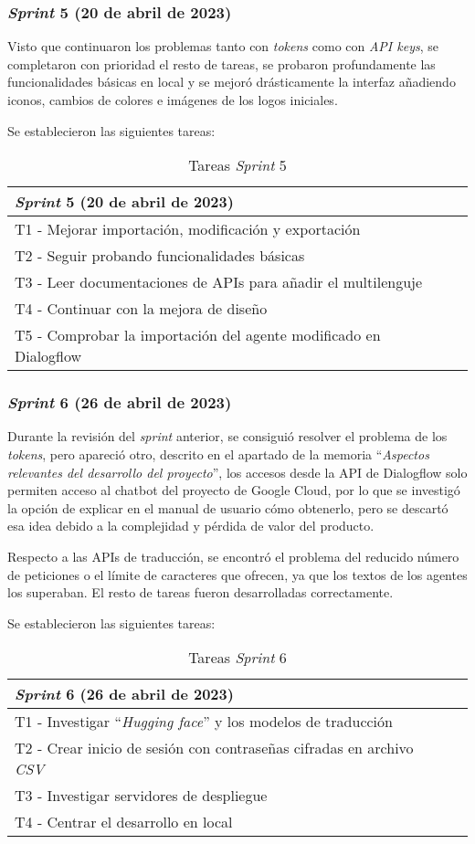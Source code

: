 \subsubsection{\textit{Sprint} 5 (20 de abril de 2023)}
Visto que continuaron los problemas tanto con \textit{tokens} como con \textit{API keys}, se completaron con prioridad el resto de tareas, se probaron profundamente las funcionalidades básicas en local y se mejoró drásticamente la interfaz añadiendo iconos, cambios de colores e imágenes de los logos iniciales.

Se establecieron las siguientes tareas:
\begin{table}[H]
\centering
\begin{tabular}{ll}
\toprule
\textit{Sprint} 5 (20 de abril de 2023)   \\
\midrule
T1 - Mejorar importación, modificación y exportación\\
T2 - Seguir probando funcionalidades básicas\\
T3 - Leer documentaciones de APIs para añadir el multilenguje\\
T4 - Continuar con la mejora de diseño\\
T5 - Comprobar la importación del agente modificado en Dialogflow\\
\bottomrule
\end{tabular}
\caption{Tareas \textit{Sprint} 5}
\end{table}

\subsubsection{\textit{Sprint} 6 (26 de abril de 2023)}
Durante la revisión del \textit{sprint} anterior, se consiguió resolver el problema de los \textit{tokens}, pero apareció otro, descrito en el apartado de la memoria ``\textit{Aspectos relevantes del desarrollo del proyecto}'', los accesos desde la API de Dialogflow solo permiten acceso al chatbot del proyecto de Google Cloud, por lo que se investigó la opción de explicar en el manual de usuario cómo obtenerlo, pero se descartó esa idea debido a la complejidad y pérdida de valor del producto. 

Respecto a las APIs de traducción, se encontró el problema del reducido número de peticiones o el límite de caracteres que ofrecen, ya que los textos de los agentes los superaban. El resto de tareas fueron desarrolladas correctamente.

Se establecieron las siguientes tareas:
\begin{table}[H]
\centering
\begin{tabular}{ll}
\toprule
\textit{Sprint} 6 (26 de abril de 2023)   \\
\midrule
T1 - Investigar ``\textit{Hugging face}'' y los modelos de traducción\\
T2 - Crear inicio de sesión con contraseñas cifradas en archivo \textit{CSV}\\
T3 - Investigar servidores de despliegue\\
T4 - Centrar el desarrollo en local\\
\bottomrule
\end{tabular}
\caption{Tareas \textit{Sprint} 6}
\end{table}

